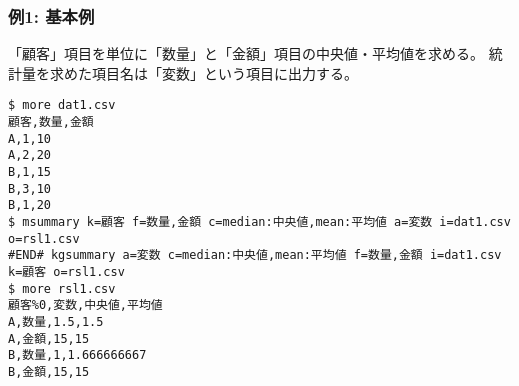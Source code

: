 \subsubsection*{例1: 基本例}

「顧客」項目を単位に「数量」と「金額」項目の中央値・平均値を求める。
統計量を求めた項目名は「変数」という項目に出力する。


\begin{Verbatim}[baselinestretch=0.7,frame=single]
$ more dat1.csv
顧客,数量,金額
A,1,10
A,2,20
B,1,15
B,3,10
B,1,20
$ msummary k=顧客 f=数量,金額 c=median:中央値,mean:平均値 a=変数 i=dat1.csv o=rsl1.csv
#END# kgsummary a=変数 c=median:中央値,mean:平均値 f=数量,金額 i=dat1.csv k=顧客 o=rsl1.csv
$ more rsl1.csv
顧客%0,変数,中央値,平均値
A,数量,1.5,1.5
A,金額,15,15
B,数量,1,1.666666667
B,金額,15,15
\end{Verbatim}
